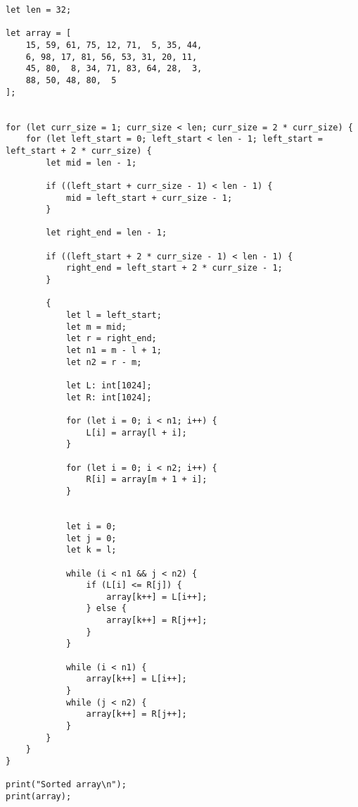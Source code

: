 \documentclass[a4paper]{article}
\begin{document}
\begin{lstlisting}[language=DPL]
let len = 32;

let array = [
    15, 59, 61, 75, 12, 71,  5, 35, 44,
    6, 98, 17, 81, 56, 53, 31, 20, 11,
    45, 80,  8, 34, 71, 83, 64, 28,  3,
    88, 50, 48, 80,  5
];


for (let curr_size = 1; curr_size < len; curr_size = 2 * curr_size) {
    for (let left_start = 0; left_start < len - 1; left_start = left_start + 2 * curr_size) {
        let mid = len - 1;

        if ((left_start + curr_size - 1) < len - 1) {
            mid = left_start + curr_size - 1;
        }

        let right_end = len - 1;

        if ((left_start + 2 * curr_size - 1) < len - 1) {
            right_end = left_start + 2 * curr_size - 1;
        }

        {
            let l = left_start;
            let m = mid;
            let r = right_end;
            let n1 = m - l + 1;
            let n2 = r - m;

            let L: int[1024];
            let R: int[1024];

            for (let i = 0; i < n1; i++) {
                L[i] = array[l + i];
            }

            for (let i = 0; i < n2; i++) {
                R[i] = array[m + 1 + i];
            }


            let i = 0;
            let j = 0;
            let k = l;

            while (i < n1 && j < n2) {
                if (L[i] <= R[j]) {
                    array[k++] = L[i++];
                } else {
                    array[k++] = R[j++];
                }
            }

            while (i < n1) {
                array[k++] = L[i++];
            }
            while (j < n2) {
                array[k++] = R[j++];
            }
        }
    }
}

print("Sorted array\n");
print(array);
\end{lstlisting}


%

%
\end{document}
